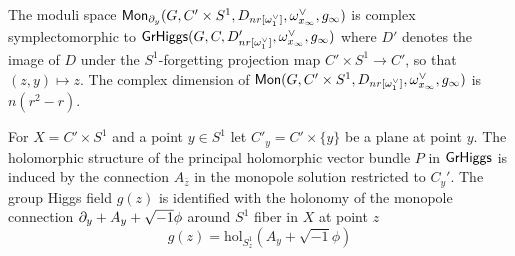 \documentclass[12pt,psamsfonts,reqno]{amsart}
\begin{document}
  
\begin{lemma}
  The moduli space $\mathsf{Mon}_{\partial_y}(G, C' \times S^1, D_{nr[\omega_1^{\vee}]}, \omega_{x_\infty}^{\vee}, g_{\infty})$
  is complex symplectomorphic to $\mathsf{GrHiggs}(G, C, D'_{nr[\omega_1^{\vee}]}, \omega_{x_\infty}^{\vee}, g_{\infty})$
  where $D'$ denotes the image of $D$ under the $S^1$-forgetting projection map $C' \times S^1 \to C'$,
  so that $(z, y) \mapsto z$. The complex dimension of $\mathsf{Mon}(G, C' \times S^1, D_{nr[\omega_1^{\vee}]}, \omega_{x_\infty}^{\vee}, g_{\infty})$ is $n(r^2-r)$. 
\end{lemma}

For $X = C' \times S^1$ and a point $y \in S^1$ let $C'_y = C' \times \{y\}$ be a plane at point $y$. 
The holomorphic structure of the principal holomorphic vector bundle $P$ in $\mathsf{GrHiggs}$ is
induced by the connection $A_{\bar z}$ in the monopole solution restricted to $C_y'$.
The group Higgs field $g(z)$ is identified with  the holonomy of the 
monopole connection $\partial_{y} + A_{y} + \sqrt{-1} \phi$
around $S^1$ fiber in $X$ at point $z$
\begin{equation}
  g(z) = \mathrm{hol}_{S^{1}_{z}} ( A_{y} + \sqrt{-1} \phi)
\end{equation}





  
  
  
\end{document}

